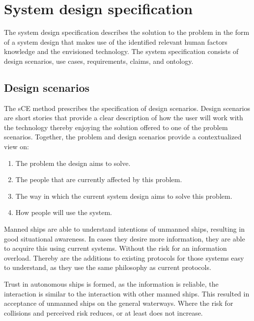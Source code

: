 \chapter{System design specification}
\label{ch:system-design}
The system design specification describes the solution to the problem in the form of a system design that makes use of the identified relevant human factors knowledge and the envisioned technology. The system specification consists of design scenarios, use cases, requirements, claims, and ontology.

\section{Design scenarios}
The sCE method prescribes the specification of design scenarios. Design scenarios are short stories that provide a clear description of how the user will work with the technology thereby enjoying the solution offered to one of the problem scenarios. Together, the problem and design scenarios provide a contextualized view on:
\begin{enumerate}
	\item The problem the design aims to solve.
	\item The people that are currently affected by this problem.
	\item The way in which the current system design aims to solve this problem.
	\item How people will use the system.
\end{enumerate}

Manned ships are able to understand intentions of unmanned ships, resulting in good situational awareness. In cases they desire more information, they are able to acquire this using current systems. Without the risk for an information overload. Thereby are the additions to existing protocols for those systems easy to understand, as they use the same philosophy as current protocols.

Trust in autonomous ships is formed, as the information is reliable, the interaction is similar to the interaction with other manned ships. This resulted in acceptance of unmanned ships on the general waterways. Where the risk for collisions and perceived risk reduces, or at least does not increase.

